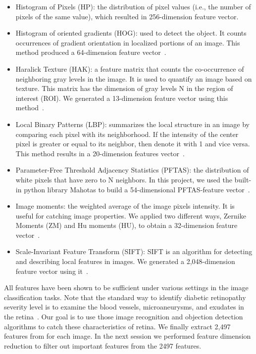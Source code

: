 
\begin{itemize}
\item Histogram of Pixels (HP): the distribution of pixel values (i.e., the number of pixels of the same value), which resulted in 256-dimension feature vector. 
\item Histogram of oriented gradients (HOG): used to detect the object. It counts occurrences of gradient orientation in localized portions of an image. This method produced a 64-dimension feature vector~\cite{hog}.
\item Haralick Texture (HAK): a feature matrix that counts the co-occurrence of neighboring gray levels in the image. It is used to quantify an image based on texture. This matrix has the dimension of gray levels N in the region of interest (ROI). We generated a 13-dimension feature vector using this method~\cite{haralick}.
\item Local Binary Patterns (LBP): summarizes the local structure in an image by comparing each pixel with its neighborhood. If the intensity of the center pixel is greater or equal to its neighbor, then denote it with 1 and vice versa. This method results in a 20-dimension features vector~\cite{lbp}. 
\item Parameter-Free Threshold Adjacency Statistics (PFTAS): the distribution of white pixels that have zero to N neighbors. In this project, we used the built-in python library Mahotas to build a 54-dimensional PFTAS-feature vector~\cite{pftas}.
\item Image moments: the weighted average of the image pixels intensity. It is useful for catching image properties. 
We applied two different ways, Zernike Moments (ZM) and Hu moments (HU), to obtain a 32-dimension feature vector~\cite{zm,hu}.
\item Scale-Invariant Feature Transform (SIFT): SIFT is an algorithm for detecting and describing 
local features in images. We generated a 2,048-dimension feature vector using it~\cite{sift}. 	
\end{itemize}

All features have been shown to be sufficient under various settings in the image classification tasks. Note that the standard way to identify diabetic retinopathy 
severity level is to examine the blood vessels, microaneurysms, and exudates in 
the retina~\cite{1,2,3}. Our goal is to use those image recognition and objection detection algorithms  
to catch these characteristics of retina. We finally extract 2,497 features from for each image. In the next session we performed 
feature dimension reduction to filter out important features from the 2497 features. 	

